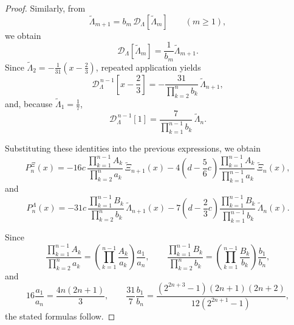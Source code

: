 \documentclass[10pt,a4paper]{amsart}
\begin{document}
\begin{proof}
Similarly, from
\[
\widetilde{\Lambda}_{m+1}=b_m\,\mathcal D_\Lambda[\widetilde{\Lambda}_m]
\qquad (m\ge1),
\]
we obtain
\[
\mathcal D_\Lambda[\widetilde{\Lambda}_m]=\frac{1}{b_m}\widetilde{\Lambda}_{m+1}.
\]
Since \(\widetilde{\Lambda}_2=-\frac1{31}\left(x-\frac23\right)\), repeated application yields
\[
\mathcal D_\Lambda^{\,n-1}\!\left[x-\frac23\right]
=
-\frac{31}{\displaystyle\prod_{k=2}^{n}b_k}\,\widetilde{\Lambda}_{n+1},
\]
and, because \(\widetilde{\Lambda}_1=\frac17\),
\[
\mathcal D_\Lambda^{\,n-1}[1]
=
\frac{7}{\displaystyle\prod_{k=1}^{n-1}b_k}\,\widetilde{\Lambda}_n.
\]

Substituting these identities into the previous expressions, we obtain
\[
P_n^\Xi(x)
=
-16c\,
\frac{\displaystyle\prod_{k=1}^{n-1}A_k}{\displaystyle\prod_{k=2}^{n}a_k}\,
\widetilde{\Xi}_{n+1}(x)
-
4\left(d-\frac56c\right)
\frac{\displaystyle\prod_{k=1}^{n-1}A_k}{\displaystyle\prod_{k=1}^{n-1}a_k}\,
\widetilde{\Xi}_n(x),
\]
and
\[
P_n^\Lambda(x)
=
-31c\,
\frac{\displaystyle\prod_{k=1}^{n-1}B_k}{\displaystyle\prod_{k=2}^{n}b_k}\,
\widetilde{\Lambda}_{n+1}(x)
-
7\left(d-\frac23c\right)
\frac{\displaystyle\prod_{k=1}^{n-1}B_k}{\displaystyle\prod_{k=1}^{n-1}b_k}\,
\widetilde{\Lambda}_n(x).
\]

Since
\[
\frac{\displaystyle\prod_{k=1}^{n-1}A_k}{\displaystyle\prod_{k=2}^{n}a_k}
=
\left(\displaystyle\prod_{k=1}^{n-1}\frac{A_k}{a_k}\right)\frac{a_1}{a_n},
\qquad
\frac{\displaystyle\prod_{k=1}^{n-1}B_k}{\displaystyle\prod_{k=2}^{n}b_k}
=
\left(\displaystyle\prod_{k=1}^{n-1}\frac{B_k}{b_k}\right)\frac{b_1}{b_n},
\]
and
\[
16\frac{a_1}{a_n}=\frac{4n(2n+1)}{3},
\qquad
\frac{31}{7}\frac{b_1}{b_n}
=
\frac{(2^{2n+3}-1)(2n+1)(2n+2)}{12(2^{2n+1}-1)},
\]
the stated formulas follow.
\end{proof}
\end{document}
